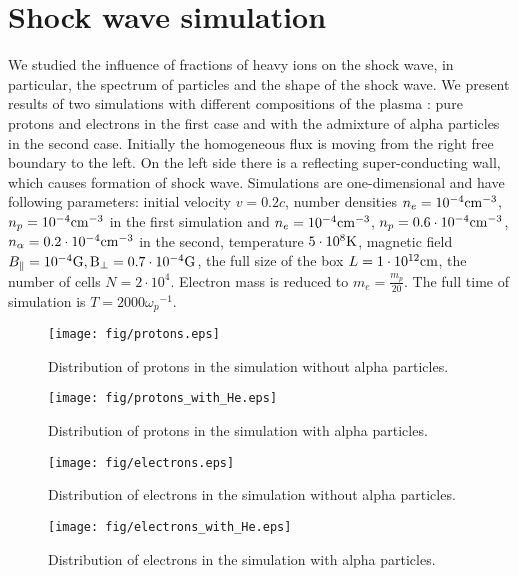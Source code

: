 \section{Shock wave simulation}
We studied the influence of fractions of heavy ions on the shock wave, in particular, the spectrum of particles and the shape of the shock wave. We present results of two simulations with different compositions of the plasma : pure protons and electrons in the first case and with the admixture of alpha particles in the second case. Initially the homogeneous flux is  moving from the right free boundary to the left. On the left side there is a reflecting super-conducting wall, which causes formation of shock wave. Simulations are one-dimensional and have following parameters: initial velocity $v = 0.2c$, number densities $n_e = 10^{-4} \rm{cm}^{-3}$, $n_p = 10^{-4} \rm{cm}^{-3}$ in the first simulation and $n_e = 10^{-4} \rm{cm}^{-3}$, $n_p = 0.6\cdot10^{-4} \rm{cm}^{-3}$, $n_\alpha = 0.2\cdot10^{-4} \rm{cm}^{-3}$ in the second, temperature $5\cdot10^8 \rm{K}$, magnetic field $B_\parallel = 10^{-4} \rm{G}, B_\perp= 0.7\cdot10^{-4} \rm{G}$, the full size of the box $L = 1\cdot10^{12} \rm{cm}$, the number of cells $N=2\cdot10^4$. Electron mass is reduced to $m_e = \frac{m_p}{20}$. The full time of simulation is $T = 2000 {\omega_p}^{-1}$.
\begin{figure}[h!]
	\centering
	\begin{minipage}{0.49\textwidth}
		\centering
		\texttt{[image: fig/protons.eps]} 
		\caption{Distribution of protons in the simulation without alpha particles.}
		\label{protons}
	\end{minipage}\hfill
	\begin{minipage}{0.49\textwidth}
		\centering
		\texttt{[image: fig/protons\_with\_He.eps]} 
		\caption{Distribution of protons in the simulation with alpha particles.}
		\label{protons_with_alpha}
	\end{minipage}
\end{figure}
\begin{figure}[h!]
	\centering
	\begin{minipage}{0.49\textwidth}
		\centering
		\texttt{[image: fig/electrons.eps]} 
		\caption{Distribution of electrons in the simulation without alpha particles.}
		\label{electrons}
	\end{minipage}\hfill
	\begin{minipage}{0.49\textwidth}
		\centering
		\texttt{[image: fig/electrons\_with\_He.eps]} 
		\caption{Distribution of electrons in the simulation with alpha particles.}
		\label{electrons_with_alpha}
	\end{minipage}
\end{figure}

